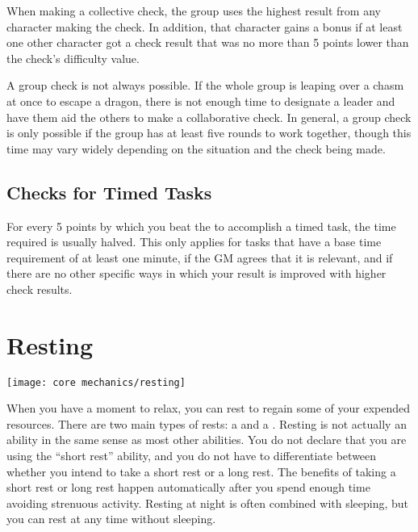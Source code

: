         When making a collective check, the group uses the highest result from any character making the check.
        In addition, that character gains a  bonus if at least one other character got a check result that was no more than 5 points lower than the check's difficulty value.

         A group check is not always possible. If the whole group is leaping over a chasm at once to escape a dragon, there is not enough time to designate a leader and have them aid the others to make a collaborative check. In general, a group check is only possible if the group has at least five rounds to work together, though this time may vary widely depending on the situation and the check being made.

    \subsection{Checks for Timed Tasks}
        For every 5 points by which you beat the  to accomplish a timed task, the time required is usually halved.
        This only applies for tasks that have a base time requirement of at least one minute, if the GM agrees that it is relevant, and if there are no other specific ways in which your result is improved with higher check results.

\section{Resting}\label{Resting}
    \texttt{[image: core mechanics/resting]}

    When you have a moment to relax, you can rest to regain some of your expended resources.
    There are two main types of rests: a  and a .
    Resting is not actually an ability in the same sense as most other abilities.
    You do not declare that you are using the ``short rest'' ability, and you do not have to differentiate between whether you intend to take a short rest or a long rest.
    The benefits of taking a short rest or long rest happen automatically after you spend enough time avoiding strenuous activity.
    Resting at night is often combined with sleeping, but you can rest at any time without sleeping.


